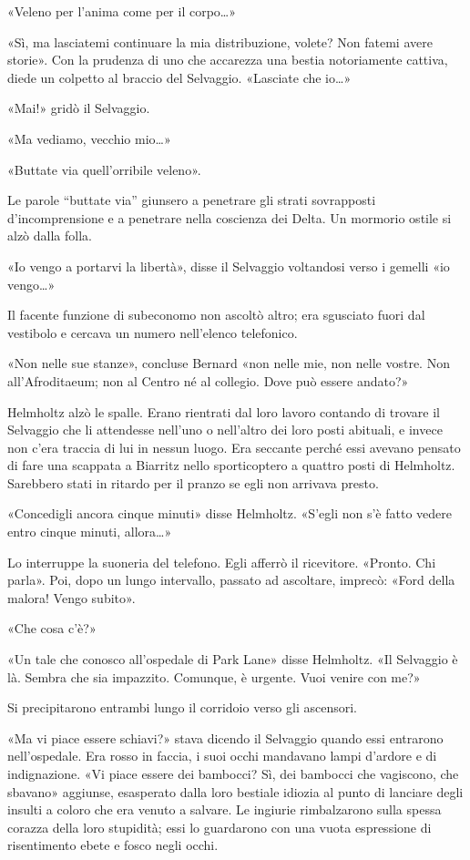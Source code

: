 \documentclass[
a5paper, %
10pt, %
twoside, 
onecolumn, %
openany, %
]{memoir}
\begin{document}
«Veleno per l’anima come per il corpo…»

«Sì, ma lasciatemi continuare la mia distribuzione, volete? Non fatemi avere storie». Con la prudenza di uno che accarezza una bestia notoriamente cattiva, diede un colpetto al braccio del Selvaggio. «Lasciate che io…»

«Mai!» gridò il Selvaggio.

«Ma vediamo, vecchio mio…»

«Buttate via quell’orribile veleno».

Le parole “buttate via” giunsero a penetrare gli strati sovrapposti d’incomprensione e a penetrare nella coscienza dei Delta. Un mormorio ostile si alzò dalla folla.

«Io vengo a portarvi la libertà», disse il Selvaggio voltandosi verso i gemelli «io vengo…»

Il facente funzione di subeconomo non ascoltò altro; era sgusciato fuori dal vestibolo e cercava un numero nell’elenco telefonico.

«Non nelle sue stanze», concluse Bernard «non nelle mie, non nelle vostre. Non all’Afroditaeum; non al Centro né al collegio. Dove può essere andato?»

Helmholtz alzò le spalle. Erano rientrati dal loro lavoro contando di trovare il Selvaggio che li attendesse nell’uno o nell’altro dei loro posti abituali, e invece non c’era traccia di lui in nessun luogo. Era seccante perché essi avevano pensato di fare una scappata a Biarritz nello sporticoptero a quattro posti di Helmholtz. Sarebbero stati in ritardo per il pranzo se egli non arrivava presto.

«Concedigli ancora cinque minuti» disse Helmholtz. «S’egli non s’è fatto vedere entro cinque minuti, allora…»

Lo interruppe la suoneria del telefono. Egli afferrò il ricevitore. «Pronto. Chi parla». Poi, dopo un lungo intervallo, passato ad ascoltare, imprecò: «Ford della malora! Vengo subito».

«Che cosa c’è?»

«Un tale che conosco all’ospedale di Park Lane» disse Helmholtz. «Il Selvaggio è là. Sembra che sia impazzito. Comunque, è urgente. Vuoi venire con me?»

Si precipitarono entrambi lungo il corridoio verso gli ascensori.

«Ma vi piace essere schiavi?» stava dicendo il Selvaggio quando essi entrarono nell’ospedale. Era rosso in faccia, i suoi occhi mandavano lampi d’ardore e di indignazione. «Vi piace essere dei bambocci? Sì, dei bambocci che vagiscono, che sbavano» aggiunse, esasperato dalla loro bestiale idiozia al punto di lanciare degli insulti a coloro che era venuto a salvare. Le ingiurie rimbalzarono sulla spessa corazza della loro stupidità; essi lo guardarono con una vuota espressione di risentimento ebete e fosco negli occhi.
\end{document}
